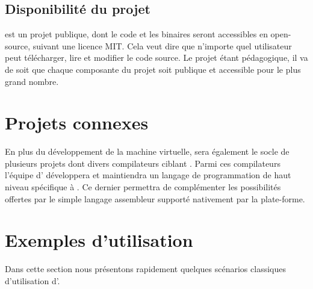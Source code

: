 \documentclass[11pt,twoside]{article}
\begin{document}
\subsection{Disponibilité du projet}

 est un projet publique, dont le code et les binaires seront
accessibles en open-source, suivant une licence MIT. Cela veut dire
que n'importe quel utilisateur peut télécharger, lire et modifier
le code source. Le projet étant pédagogique, il va de soit que chaque
composante du projet soit publique et accessible pour le plus grand nombre.


\section{Projets connexes}

En plus du développement de la machine virtuelle,  sera
également le socle de plusieurs projets dont divers compilateurs ciblant
. Parmi ces compilateurs l'équipe d' développera et maintiendra
un langage de programmation de haut niveau spécifique à . Ce dernier
permettra de complémenter les possibilités offertes par le simple langage
assembleur supporté nativement par la plate-forme.

\section{Exemples d’utilisation}

Dans cette section nous présentons rapidement quelques scénarios classiques d'utilisation d'.
\end{document}
